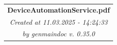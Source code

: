 
\vfill
\begin{center}
\begin{tabular}{m{16em}}\hline
   \multicolumn{1}{c}{\textbf{DeviceAutomationService.pdf}}\\
   \multicolumn{1}{c}{\textit{Created at 11.03.2025 - 14:24:33}}\\
   \multicolumn{1}{c}{\textit{by genmaindoc v. 0.35.0}}\\ \hline
\end{tabular}
\end{center}

